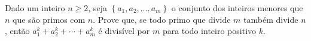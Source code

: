 Dado um inteiro $n\geq2$, seja $\left\{a_1,a_2,\ldots,a_m\right\}$ o conjunto dos inteiros menores que $n$ que são primos com $n$. Prove que, se todo primo que divide $m$ também divide $n$, então $a_1^k+a_2^k+\cdots+a_m^k$ é divisível por $m$ para todo inteiro positivo $k$.
